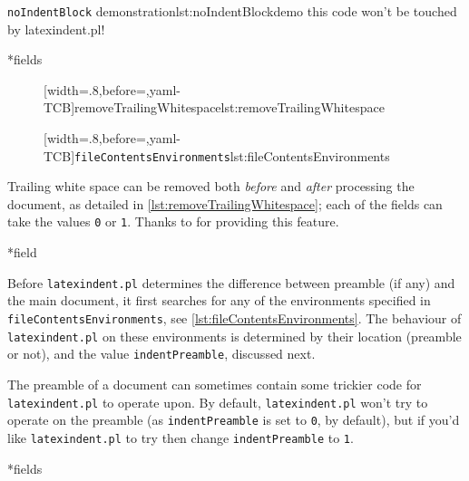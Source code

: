 \documentclass[10pt]{article}
\begin{document}
\begin{cmhlistings}[style=demo,escapeinside={(*@}{@*)}]{\texttt{noIndentBlock} demonstration}{lst:noIndentBlockdemo}
        this code
                won't
     be touched
                    by
             latexindent.pl!
	\end{cmhlistings}

*{fields}

\begin{figure}
[width=.8\linewidth,before=\centering,yaml-TCB]{removeTrailingWhitespace}{lst:removeTrailingWhitespace}

\vspace{.2cm}
[width=.8\linewidth,before=\centering,yaml-TCB]{\texttt{fileContentsEnvironments}}{lst:fileContentsEnvironments}
\end{figure}
Trailing white space can be removed both \emph{before} and \emph{after} processing 
the document, as detailed in \cref{lst:removeTrailingWhitespace}; each of the fields 
can take the values \texttt{0} or \texttt{1}.
Thanks to \cite{vosskuhle} for providing this feature.

*{field}

Before \texttt{latexindent.pl} determines the difference between preamble (if any) and the main document,
it first searches for any of the environments specified in \texttt{fileContentsEnvironments}, see
\cref{lst:fileContentsEnvironments}.
  The behaviour of \texttt{latexindent.pl} on these environments is determined by their location (preamble or not), and 
  the value \texttt{indentPreamble}, discussed next.


The preamble of a document can sometimes contain some trickier code
for \texttt{latexindent.pl} to operate upon. By default, \texttt{latexindent.pl}
won't try to operate on the preamble (as \texttt{indentPreamble} is set to \texttt{0},
by default), but if you'd like \texttt{latexindent.pl} to try then change \texttt{indentPreamble} to \texttt{1}.

*{fields}
\end{document}
